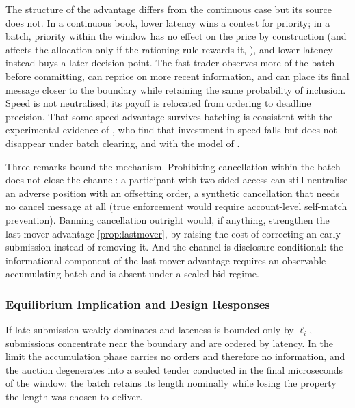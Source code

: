 The structure of the advantage differs from the continuous case but its
source does not. In a continuous book, lower latency wins a contest for
priority; in a batch, priority within the window has no effect on the
price by construction (and affects the allocation only if the rationing
rule rewards it, ), and lower latency instead buys a
later decision point. The fast trader observes more of the batch before
committing, can reprice on more recent information, and can place its
final message closer to the boundary while retaining the same probability
of inclusion. Speed is not neutralised; its payoff is relocated from
ordering to deadline precision. That some speed advantage survives
batching is consistent with the experimental evidence of
\citet{aldrich2020experiments}, who find that investment in speed falls but
does not disappear under batch clearing, and with the model of
\citet{zoican2021speed}.

Three remarks bound the mechanism. Prohibiting cancellation within the
batch does not close the channel: a participant with two-sided access can
still neutralise an adverse position with an offsetting order, a
synthetic cancellation that needs no cancel message at all (true
enforcement would require account-level self-match prevention). Banning
cancellation outright would, if anything, strengthen the last-mover
advantage \eqref{prop:lastmover}, by raising the cost of correcting an
early submission instead of removing it. And the channel is
disclosure-conditional: the informational component of the last-mover
advantage requires an observable accumulating batch and is absent under a
sealed-bid regime.

\subsubsection{Equilibrium Implication and Design Responses}

If late submission weakly dominates and lateness is bounded only by
$\ell_i$, submissions concentrate near the boundary and are ordered by
latency. In the limit the accumulation phase carries no orders and
therefore no information, and the auction degenerates into a sealed tender
conducted in the final microseconds of the window: the batch retains its
length nominally while losing the property the length was chosen to
deliver.

